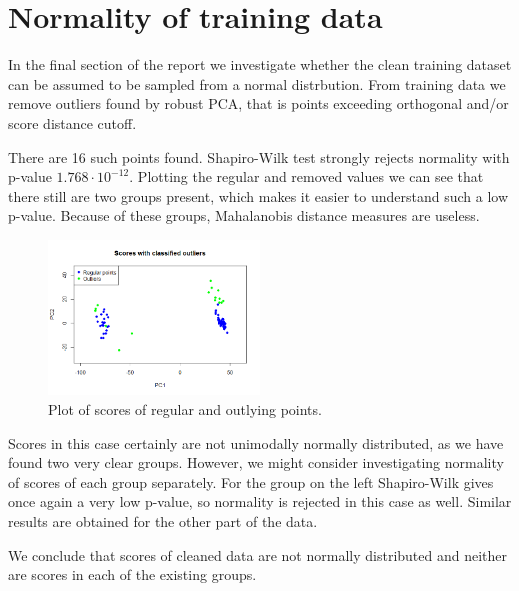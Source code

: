 \documentclass[12pt]{article}
\begin{document}
\section{Normality of training data}
In the final section of the report we investigate whether the clean training dataset can be assumed to be sampled from a normal distrbution.
From training data we remove outliers found by robust PCA, that is points exceeding orthogonal and/or score distance cutoff.

There are 16 such points found. Shapiro-Wilk test strongly rejects normality with p-value
$1.768\cdot 10^{-12}.$ Plotting the regular and removed values we can see that there still are two groups present, which makes it
easier to understand such a low p-value. Because of these groups, Mahalanobis distance measures are useless.
\begin{figure}[ht!]
  \begin{center}
    \centering
      \includegraphics[width=0.5\textwidth]{../images/regularAndOutliers.png}
      \caption{Plot of scores of regular and outlying points.}
      \label{fig:regularAndOutliers}
  \end{center}
\end{figure}

Scores in this case certainly are not unimodally normally distributed, as we have found two very clear groups. However, we might consider investigating normality of scores of
each group separately. For the group on the left Shapiro-Wilk gives once again a very low p-value, so normality is rejected in this case as well.
Similar results are obtained for the other part of the data.

We conclude that scores of cleaned data are not normally distributed and neither are scores in each of the existing groups.
\end{document}
